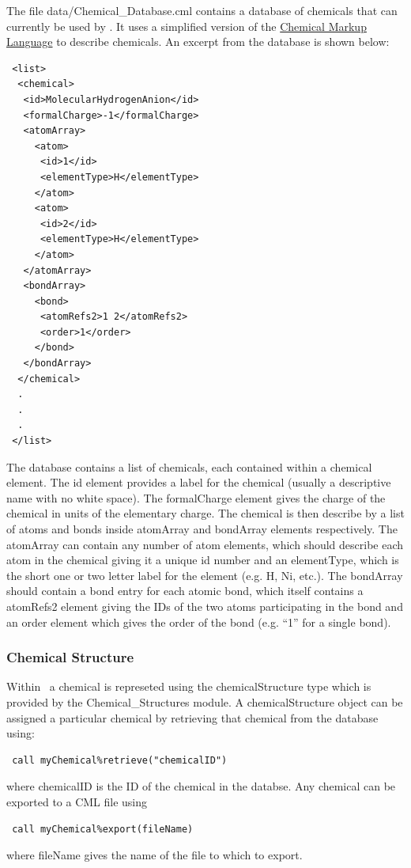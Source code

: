The file {\normalfont \ttfamily data/Chemical\_Database.cml} contains a database of chemicals that can currently be used by \glc. It uses a simplified version of the \href{http://www.xml-cml.org}{Chemical Markup Language} to describe chemicals. An excerpt from the database is shown below:
\begin{verbatim}
 <list>
  <chemical>
   <id>MolecularHydrogenAnion</id>
   <formalCharge>-1</formalCharge>
   <atomArray>
     <atom>
      <id>1</id>
      <elementType>H</elementType>
     </atom>
     <atom>
      <id>2</id>
      <elementType>H</elementType>
     </atom>
   </atomArray>
   <bondArray>
     <bond>
      <atomRefs2>1 2</atomRefs2>
      <order>1</order>
     </bond>
   </bondArray>
  </chemical>
  .
  .
  .
 </list>
\end{verbatim}
The database contains a {\normalfont \ttfamily list} of chemicals, each contained within a {\normalfont \ttfamily chemical} element. The {\normalfont \ttfamily id} element provides a label for the chemical (usually a descriptive name with no white space). The {\normalfont \ttfamily formalCharge} element gives the charge of the chemical in units of the elementary charge. The chemical is then describe by a list of atoms and bonds inside {\normalfont \ttfamily atomArray} and {\normalfont \ttfamily bondArray} elements respectively. The {\normalfont \ttfamily atomArray} can contain any number of {\normalfont \ttfamily atom} elements, which should describe each atom in the chemical giving it a unique {\normalfont \ttfamily id} number and an {\normalfont \ttfamily elementType}, which is the short one or two letter label for the element (e.g. H, Ni, etc.). The {\normalfont \ttfamily bondArray} should contain a {\normalfont \ttfamily bond} entry for each atomic bond, which itself contains a {\normalfont \ttfamily atomRefs2} element giving the IDs of the two atoms participating in the bond and an {\normalfont \ttfamily order} element which gives the order of the bond (e.g. ``1'' for a single bond).

\subsubsection{Chemical Structure}

Within \glc\ a chemical is represeted using the {\normalfont \ttfamily chemicalStructure} type which is provided by the {\normalfont \ttfamily Chemical\_Structures} module. A {\normalfont \ttfamily chemicalStructure} object can be assigned a particular chemical by retrieving that chemical from the database using:
\begin{verbatim}
 call myChemical%retrieve("chemicalID")
\end{verbatim}
where {\normalfont \ttfamily chemicalID} is the ID of the chemical in the databse. Any chemical can be exported to a CML file using
\begin{verbatim}
 call myChemical%export(fileName)
\end{verbatim}
where {\normalfont \ttfamily fileName} gives the name of the file to which to export.

